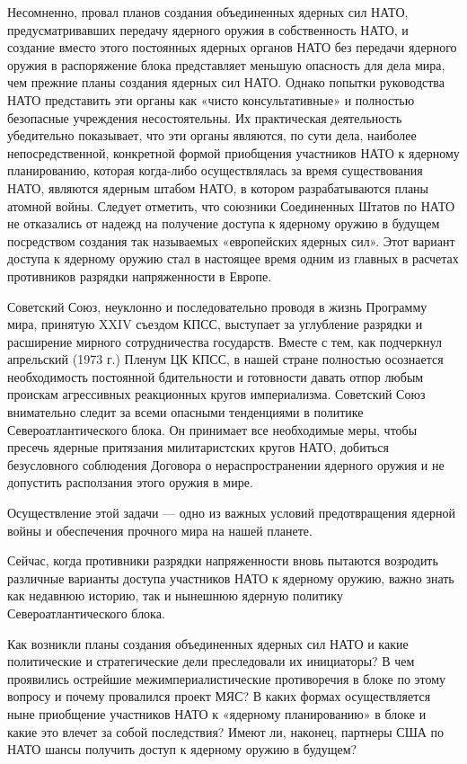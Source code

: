\documentclass[12pt, a4paper, openany]{book}
\begin{document}
Несомненно, провал планов создания объединенных ядерных сил НАТО, предусматривавших передачу ядерного оружия в собственность НАТО, и создание вместо этого постоянных ядерных органов НАТО без передачи ядерного оружия в распоряжение блока представляет меньшую опасность для дела мира, чем прежние планы создания ядерных сил НАТО. Однако попытки руководства НАТО представить эти органы как «чисто консультативные» и полностью безопасные учреждения несостоятельны. Их практическая деятельность убедительно показывает, что эти органы являются, по сути дела, наиболее непосредственной, конкретной формой приобщения участников НАТО к ядерному планированию, которая когда-либо осуществлялась за время существования НАТО, являются ядерным штабом НАТО, в котором разрабатываются планы атомной войны. Следует отметить, что союзники Соединенных Штатов по НАТО не отказались от надежд на получение доступа к ядерному оружию в будущем посредством создания так называемых «европейских ядерных сил». Этот вариант доступа к ядерному оружию стал в настоящее время одним из главных в расчетах противников разрядки напряженности в Европе.

Советский Союз, неуклонно и последовательно проводя в жизнь Программу мира, принятую XXIV съездом КПСС, выступает за углубление разрядки и расширение мирного сотрудничества государств. Вместе с тем, как подчеркнул апрельский (1973 г.) Пленум ЦК КПСС, в нашей стране полностью осознается необходимость постоянной бдительности и готовности давать отпор любым проискам агрессивных реакционных кругов империализма. Советский Союз внимательно следит за всеми опасными тенденциями в политике Североатлантического блока. Он принимает все необходимые меры, чтобы пресечь ядерные притязания милитаристских кругов НАТО, добиться безусловного соблюдения Договора о нераспространении ядерного оружия и не допустить расползания этого оружия в мире.

Осуществление этой задачи — одно из важных условий предотвращения ядерной войны и обеспечения прочного мира на нашей планете.

Сейчас, когда противники разрядки напряженности вновь пытаются возродить различные варианты доступа участников НАТО к ядерному оружию, важно знать как недавнюю историю, так и нынешнюю ядерную политику Североатлантического блока.

Как возникли планы создания объединенных ядерных сил НАТО и какие политические и стратегические дели преследовали их инициаторы? В чем проявились острейшие межимпериалистические противоречия в блоке по этому вопросу и почему провалился проект МЯС? В каких формах осуществляется ныне приобщение участников НАТО к «ядерному планированию» в блоке и какие это влечет за собой последствия? Имеют ли, наконец, партнеры США по НАТО шансы получить доступ к ядерному оружию в будущем?
\end{document}
